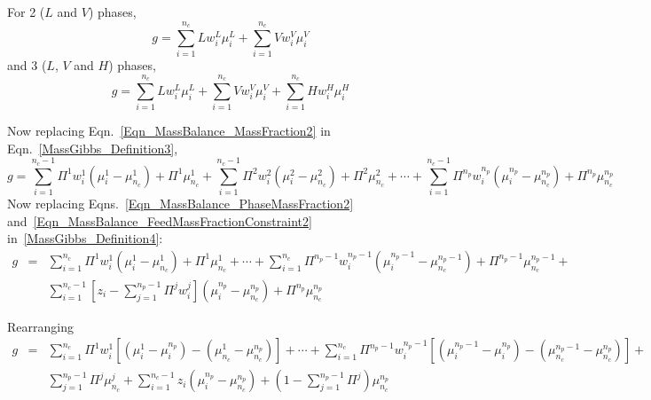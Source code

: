 \documentclass[12pts,a4paper,amsmath,amssymb,floatfix]{article}%
\newcommand{\summation}{\sum\limits}
\begin{document}
\begin{mdframed}[style=JFrame]
For 2 ($L$ and $V$) phases,
\begin{displaymath}
g = \summation_{i=1}^{n_{c}}Lw_{i}^{L}\mu_{i}^{L} + \summation_{i=1}^{n_{c}}Vw_{i}^{V}\mu_{i}^{V}
\end{displaymath}
and 3 ($L$, $V$ and $H$) phases,
\begin{displaymath}
g = \summation_{i=1}^{n_{c}}Lw_{i}^{L}\mu_{i}^{L} + \summation_{i=1}^{n_{c}}Vw_{i}^{V}\mu_{i}^{V} + \summation_{i=1}^{n_{c}}Hw_{i}^{H}\mu_{i}^{H}
\end{displaymath}
\end{mdframed}


Now replacing Eqn.~\ref{Eqn_MassBalance_MassFraction2} in Eqn.~\ref{MassGibbs_Definition3},
\begin{equation}
g = \summation_{i=1}^{n_{c}-1}\Pi^{1}w_{i}^{1}\left(\mu_{i}^{1}-\mu_{n_{c}}^{1}\right) + \Pi^{1}\mu_{n_{c}}^{1} + \summation_{i=1}^{n_{c}-1}\Pi^{2}w_{i}^{2}\left(\mu_{i}^{2}-\mu_{n_{c}}^{2}\right) + \Pi^{2}\mu_{n_{c}}^{2} + \cdots + \summation_{i=1}^{n_{c}-1}\Pi^{n_{p}}w_{i}^{n_{p}}\left(\mu_{i}^{n_{p}}-\mu_{n_{c}}^{n_{p}}\right) + \Pi^{n_{p}}\mu_{n_{c}}^{n_{p}}
\label{MassGibbs_Definition4}
\end{equation}
Now replacing Eqns.~\ref{Eqn_MassBalance_PhaseMassFraction2} and~\ref{Eqn_MassBalance_FeedMassFractionConstraint2} in~\ref{MassGibbs_Definition4}:
\begin{eqnarray}
g &=& \summation_{i=1}^{n_{c}}\Pi^{1}w_{i}^{1}\left(\mu_{i}^{1}-\mu_{n_{c}}^{1}\right) + \Pi^{1}\mu_{n_{c}}^{1} + \cdots + \summation_{i=1}^{n_{c}}\Pi^{n_{p}-1}w_{i}^{n_{p}-1}\left(\mu_{i}^{n_{p}-1}-\mu_{n_{c}}^{n_{p}-1}\right) + \Pi^{n_{p}-1}\mu_{n_{c}}^{n_{p}-1} + \nonumber \\
   && \summation_{i=1}^{n_{c}-1}\left[z_{i} - \summation_{j=1}^{n_{p}-1}\Pi^{j}w_{i}^{j}\right]\left(\mu_{i}^{n_{p}}-\mu_{n_{c}}^{n_{p}}\right) + \Pi^{n_{p}}\mu_{n_{c}}^{n_{p}}\nonumber
\end{eqnarray}

Rearranging
\begin{eqnarray}
g &=& \summation_{i=1}^{n_{c}}\Pi^{1}w_{i}^{1}\left[\left(\mu_{i}^{1}-\mu_{i}^{n_{p}}\right) - \left(\mu_{n_{c}}^{1}-\mu_{n_{c}}^{n_{p}}\right)\right] + \cdots + \summation_{i=1}^{n_{c}}\Pi^{n_{p}-1}w_{i}^{n_{p}-1}\left[\left(\mu_{i}^{n_{p}-1}-\mu_{i}^{n_{p}}\right) - \left(\mu_{n_{c}}^{n_{p}-1}-\mu_{n_{c}}^{n_{p}}\right)\right] + \nonumber \\
&& \summation_{j=1}^{n_{p}-1}\Pi^{j}\mu_{n_{c}}^{j} + \summation_{i=1}^{n_{c}-1}z_{i}\left(\mu_{i}^{n_{p}}-\mu_{n_{c}}^{n_{p}}\right) +\left(1-\summation_{j=1}^{n_{p}-1}\Pi^{j}\right)\mu_{n_{c}}^{n_{p}} \nonumber
\end{eqnarray}
\end{document}
